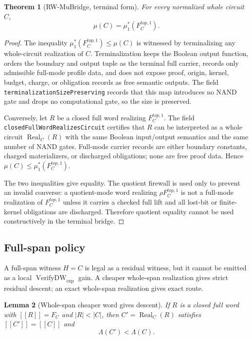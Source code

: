 \documentclass[10.5pt,a4paper]{article}
\newtheorem{theorem}{Theorem}[section]
\newtheorem{lemma}[theorem]{Lemma}
\newcommand{\Real}{\operatorname{Real}}
\newcommand{\VerifyDW}{\operatorname{VerifyDW}_{\exp}}
\begin{document}
\begin{theorem}[RW-MuBridge, terminal form]
For every normalized whole circuit \(C\),
\[
\mu(C)=\mu_1^*(F_C^{top,1}).
\]
\end{theorem}

\begin{proof}
The inequality \(\mu_1^*(F_C^{top,1})\le \mu(C)\) is witnessed by terminalizing any whole-circuit realization of \(C\).  Terminalization keeps the Boolean output function, orders the boundary and output tuple as the terminal full carrier, records only admissible full-mode profile data, and does not expose proof, origin, kernel, budget, charge, or obligation records as free semantic outputs.  The field \texttt{terminalizationSizePreserving} records that this map introduces no NAND gate and drops no computational gate, so the size is preserved.

Conversely, let \(R\) be a closed full word realizing \(F_C^{top,1}\).  The field \texttt{closedFullWordRealizesCircuit} certifies that \(R\) can be interpreted as a whole circuit \(\Real_C(R)\) with the same Boolean input/output semantics and the same number of NAND gates.  Full-mode carrier records are either boundary constants, charged materializers, or discharged obligations; none are free proof data.  Hence \(\mu(C)\le \mu_1^*(F_C^{top,1})\).

The two inequalities give equality.  The quotient firewall is used only to prevent an invalid converse: a quotient-mode word realizing \(\rho F_C^{top,1}\) is not a full-mode realization of \(F_C^{top,1}\) unless it carries a checked full lift and all lost-bit or finite-kernel obligations are discharged.  Therefore quotient equality cannot be used constructively in the terminal bridge.
\end{proof}

\subsection{Full-span policy}
A full-span witness \(H=C\) is legal as a residual witness, but it cannot be emitted as a local \(\VerifyDW\) gain. A cheaper whole-span realization gives strict residual descent; an exact whole-span realization gives exact route.

\begin{lemma}[Whole-span cheaper word gives descent]
If \(R\) is a closed full word with \([[R]]=F_C\) and \(|R|<|C|\), then \(C'=\Real_C(R)\) satisfies \([[C']]=[[C]]\) and
\[
\Lambda(C')<\Lambda(C).
\]
\end{lemma}
\end{document}
